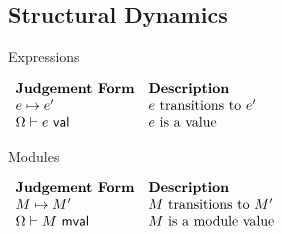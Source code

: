 
\subsection{Structural Dynamics}
Expressions

\vspace{10px}
$\begin{array}{ll}
\textbf{Judgement Form} & \textbf{Description}\\
e \mapsto e' & \text{$e$ transitions to $e'$}\\
\Omega \vdash e~\mathsf{val} & \text{$e$ is a value}
\end{array}$
\vspace{10px}

Modules

\vspace{10px}
$\begin{array}{ll}
\textbf{Judgement Form} & \textbf{Description}\\
M \mapsto M' & \text{$M$ transitions to $M'$}\\
\Omega \vdash M~\mathsf{mval} & \text{$M$ is a module value}
\end{array}$
\vspace{10px}


